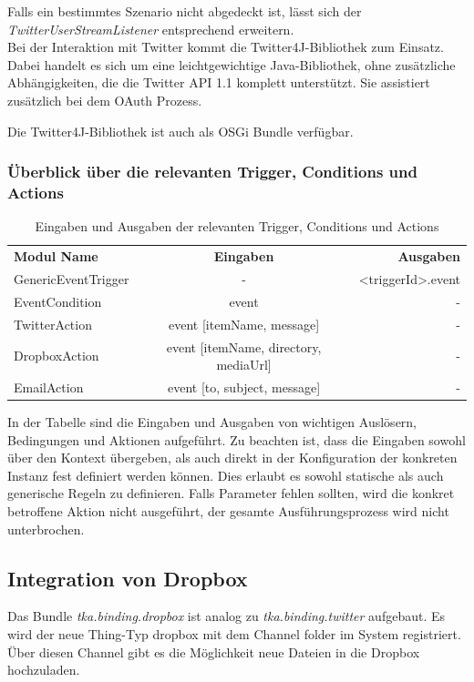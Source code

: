 Falls ein bestimmtes Szenario nicht abgedeckt ist, lässt sich der \textit{TwitterUserStreamListener} entsprechend erweitern.\\



Bei der Interaktion mit Twitter kommt die Twitter4J-Bibliothek\cite{twitter4j} zum Einsatz. Dabei handelt es sich um eine leichtgewichtige Java-Bibliothek, ohne zusätzliche Abhängigkeiten, die die Twitter API 1.1 komplett unterstützt. Sie assistiert zusätzlich bei dem OAuth Prozess. 

Die Twitter4J-Bibliothek ist auch als OSGi Bundle verfügbar.




\subsubsection{Überblick über die relevanten Trigger, Conditions und Actions}
\begin{table}[h]
\centering
\begin{tabular}{l|c|r}
	\textbf{Modul Name}  & \textbf{Eingaben} & \textbf{Ausgaben} \\
	GenericEventTrigger  & -        			&  <triggerId>.event   \\ 
    EventCondition		&	event   			&	-\\
    TwitterAction		&	event [itemName, message]	& 	-	\\
    DropboxAction		&	event [itemName, directory, mediaUrl]	& - \\
    EmailAction			&	event [to, subject, message]	& -\\
\end{tabular}
\caption{Eingaben und Ausgaben der relevanten Trigger, Conditions und Actions}
\label{table:io}
\end{table}

In der Tabelle sind die Eingaben und Ausgaben von wichtigen Auslösern, Bedingungen und Aktionen aufgeführt. Zu beachten ist, dass die Eingaben sowohl über den Kontext übergeben, als auch direkt in der Konfiguration der konkreten Instanz fest definiert werden können. Dies erlaubt es sowohl statische als auch generische Regeln zu definieren. Falls Parameter fehlen sollten, wird die konkret betroffene Aktion nicht ausgeführt, der gesamte Ausführungsprozess wird nicht unterbrochen.

\subsection{Integration von Dropbox}
Das Bundle \textit{tka.binding.dropbox} ist analog zu \textit{tka.binding.twitter} aufgebaut. Es wird der neue Thing-Typ \glqq dropbox\grqq{} mit dem Channel \glqq folder\grqq{} im System registriert. Über diesen Channel gibt es die Möglichkeit neue Dateien in die Dropbox hochzuladen. \\

